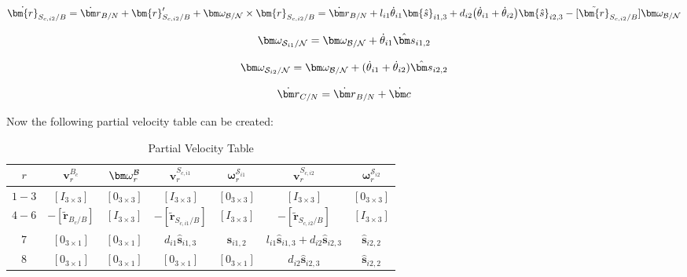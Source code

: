 \begin{equation}
	\dot{\bm{r}}_{S_{c,{i2}}/B} = \dot{\bm r}_{B/N} + \bm{r}'_{S_{c,{i2}}/B} + \bm \omega_{\cal{B/N}} \times \bm{r}_{S_{c,{i2}}/B} = \dot{\bm r}_{B/N} +l_{i1} \dot{\theta}_{i1} \bm{\hat{s}}_{i1,3} + d_{i2}\big(\dot{\theta}_{i1} + \dot{\theta}_{i2}\big)\bm{\hat{s}}_{i2,3}  - [\tilde{\bm{r}}_{S_{c,{i2}}/B}] \bm \omega_{\cal{B/N}}
\end{equation}

\begin{equation}
	\bm \omega_{\mathcal{S}_{i1}/\mathcal{N}} = \bm \omega_{\cal{B/N}} + \dot{\theta}_{i1} \hat{\bm s}_{i1,2}
\end{equation}

\begin{equation}
	\bm \omega_{\mathcal{S}_{i2}/\mathcal{N}} = \bm \omega_{\cal{B/N}} + (\dot{\theta}_{i1}  + \dot{\theta}_{i2})\hat{\bm s}_{i2,2}
\end{equation}

\begin{equation}
	\dot{\bm r}_{C/N} = \dot{\bm r}_{B/N} + \dot{\bm c}\\
	\label{eq:rDot_CN}
\end{equation}

Now the following partial velocity table can be created:

\begin{table}[htbp]
	\caption{Partial Velocity Table}
	\label{tab:hub}
	\centering \fontsize{10}{10}\selectfont
	\begin{tabular}{ c | c | c | c | c | c | c } %
		\hline
		$r$  & $\bm v^{B_c}_{r}$  & $\bm \omega_{\textit{r}}^{\cal{B}}$ & $\bm v^{S_{c,i1}}_{r}$ & $\bm \omega_{r}^{\mathcal{S}_{i1}}$ & $\bm v^{S_{c,i2}}_{r}$ & $\bm \omega_{r}^{\mathcal{S}_{i2}}$ \\
		\hline
		$1-3$  & $[I_{3\times 3}]$ & $[0_{3\times 3}]$ & $[I_{3\times 3}]$ & $[0_{3\times 3}]$ & $[I_{3\times 3}]$ & $[0_{3\times 3}]$ \\
		$4-6$ & $- [\tilde{{\bm r}}_{B_c/B}]$ & $[I_{3\times 3}]$ & $- [\tilde{\bm{r}}_{S_{c,{i1}}/B}]$ & $[I_{3\times 3}]$ & $- [\tilde{\bm{r}}_{S_{c,{i2}}/B}]$ & $[I_{3\times 3}]$\\
		$7$ &$[0_{3\times 1}]$ & $[0_{3\times 1}]$ & $d_{i1} \bm{\hat{s}}_{i1,3}$ & $\bm{\hat{s}}_{i1,2}$ & $l_{i1} \bm{\hat{s}}_{i1,3} + d_{i2} \bm{\hat{s}}_{i2,3}$ & $\hat{\bm s}_{i2,2}$ \\
		$8$ &$[0_{3\times 1}]$ & $[0_{3\times 1}]$ & $[0_{3\times 1}]$ & $[0_{3\times 1}]$ & $ d_{i2}\bm{\hat{s}}_{i2,3}$ & $\hat{\bm s}_{i2,2}$ \\
		\hline
	\end{tabular}
\end{table}

